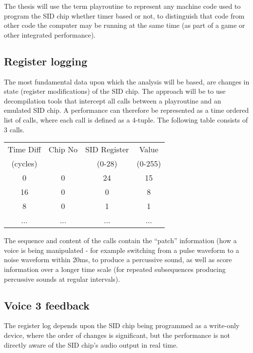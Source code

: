 \documentclass[10pt]{article}
\begin{document}
\begin{multicols*}{2}
  The thesis will use the term playroutine to represent any machine
  code used to program the SID chip whether timer based or not, to
  distinguish that code from other code the computer may be running at
  the same time (as part of a game or other integrated performance).

  \subsection{Register logging}
  The most fundamental data upon which the analysis will be based,
  are changes in state (register modifications) of the SID chip. The
  approach will be to use decompilation tools that intercept all calls
  between a playroutine and an emulated SID chip. A performance can
  therefore be represented as a time ordered list of calls, where each
  call is defined as a 4-tuple. The following table consists of 3 calls.

    \begin{tabular}{|c|c|c|c|}
        \hline
        \rule[-1ex]{0pt}{2.5ex} Time Diff & Chip No & SID Register & Value \\
        \rule[-1ex]{0pt}{2.5ex} (cycles) & & (0-28) & (0-255) \\
        \hline
        \rule[-1ex]{0pt}{2.5ex} 0 & 0 & 24 & 15 \\
        \hline
        \rule[-1ex]{0pt}{2.5ex} 16 & 0 & 0 & 8 \\
        \hline
        \rule[-1ex]{0pt}{2.5ex} 8 & 0 & 1 & 1 \\
        \hline
        \rule[-1ex]{0pt}{2.5ex} ... & ... & ... & ... \\
        \hline
    \end{tabular}

  The sequence and content of the calls contain the ``patch''
  information (how a voice is being manipulated - for example
  switching from a pulse waveform to a noise waveform within 20ms, to
  produce a percussive sound, as well as score information over a
  longer time scale (for repeated subsequences producing percussive
  sounds at regular intervals).

  \subsection{Voice 3 feedback}
  The register log depends upon the SID chip being programmed as a
  write-only device, where the order of changes is significant, but
  the performance is not directly aware of the SID chip's audio output
  in real time.


\end{multicols*}
\end{document}
